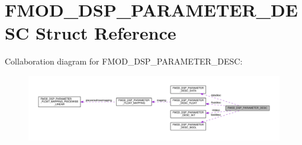 \hypertarget{structFMOD__DSP__PARAMETER__DESC}{}\section{F\+M\+O\+D\+\_\+\+D\+S\+P\+\_\+\+P\+A\+R\+A\+M\+E\+T\+E\+R\+\_\+\+D\+E\+SC Struct Reference}
\label{structFMOD__DSP__PARAMETER__DESC}


Collaboration diagram for F\+M\+O\+D\+\_\+\+D\+S\+P\+\_\+\+P\+A\+R\+A\+M\+E\+T\+E\+R\+\_\+\+D\+E\+SC\+:
\nopagebreak
\begin{figure}[H]
\begin{center}
\leavevmode
\includegraphics[width=350pt]{structFMOD__DSP__PARAMETER__DESC__coll__graph}
\end{center}
\end{figure}
